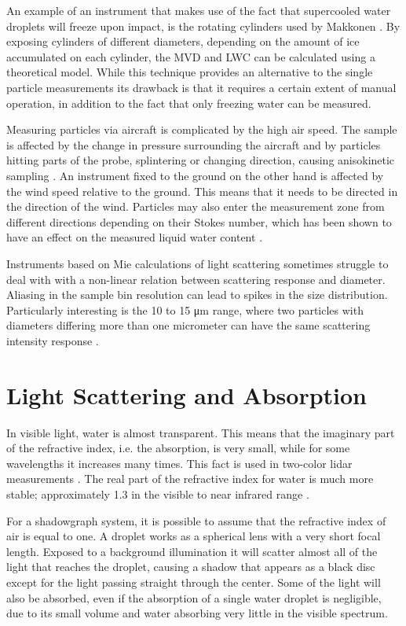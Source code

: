 An example of an instrument that makes use of the fact that supercooled water droplets will freeze upon impact, is the rotating cylinders used by Makkonen \cite{makk1992}. By exposing cylinders of different diameters, depending on the amount of ice accumulated on each cylinder, the MVD and LWC can be calculated using a theoretical model. While this technique provides an alternative to the single particle measurements its drawback is that it requires a certain extent of manual operation, in addition to the fact that only freezing water can be measured.

Measuring particles via aircraft is complicated by the high air speed. The sample is affected by the change in pressure surrounding the aircraft and by particles hitting parts of the probe, splintering or changing direction, causing anisokinetic sampling \cite{baum2011}. An instrument fixed to the ground on the other hand is affected by the wind speed relative to the ground. This means that it needs to be directed in the direction of the wind. Particles may also enter the measurement zone from different directions depending on their Stokes number, which has been shown to have an effect on the measured liquid water content \cite{henn2013}.

Instruments based on Mie calculations of light scattering sometimes struggle to deal with with a non-linear relation between scattering response and diameter. Aliasing in the sample bin resolution can lead to spikes in the size distribution. Particularly interesting is the 10 to 15 μm range, where two particles with diameters differing more than one micrometer can have the same scattering intensity response \cite{dye1984,spie2012,bohr2008}.

\section{Light Scattering and Absorption}

In visible light, water is almost transparent. This means that the imaginary part of the refractive index, i.e. the absorption, is very small, while for some wavelengths it increases many times. This fact is used in two-color lidar measurements \cite{west2010}. The real part of the refractive index for water is much more stable; approximately 1.3 in the visible to near infrared range \cite{hale1973, kou1993}. 

For a shadowgraph system, it is possible to assume that the refractive index of air is equal to one. A droplet works as a spherical lens with a very short focal length. Exposed to a background illumination it will scatter almost all of the light that reaches the droplet, causing a shadow that appears as a black disc except for the light passing straight through the center. Some of the light will also be absorbed, even if the absorption of a single water droplet is negligible, due to its small volume and water absorbing very little in the visible spectrum.

